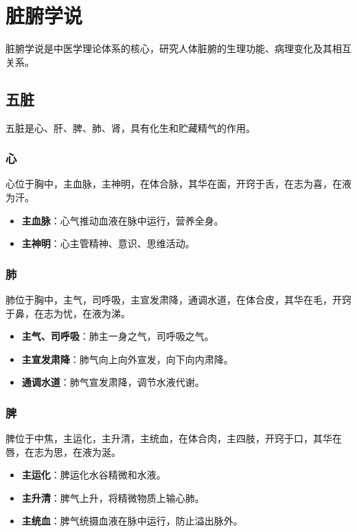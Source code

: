 \documentclass[12pt,UTF8]{ctexbook}
\begin{document}
\section{脏腑学说}

脏腑学说是中医学理论体系的核心，研究人体脏腑的生理功能、病理变化及其相互关系。

\subsection{五脏}

五脏是心、肝、脾、肺、肾，具有化生和贮藏精气的作用。

\subsubsection{心}

心位于胸中，主血脉，主神明，在体合脉，其华在面，开窍于舌，在志为喜，在液为汗。

\begin{itemize}
\item \textbf{主血脉}：心气推动血液在脉中运行，营养全身。
\item \textbf{主神明}：心主管精神、意识、思维活动。
\end{itemize}

\subsubsection{肺}

肺位于胸中，主气，司呼吸，主宣发肃降，通调水道，在体合皮，其华在毛，开窍于鼻，在志为忧，在液为涕。

\begin{itemize}
\item \textbf{主气、司呼吸}：肺主一身之气，司呼吸之气。
\item \textbf{主宣发肃降}：肺气向上向外宣发，向下向内肃降。
\item \textbf{通调水道}：肺气宣发肃降，调节水液代谢。
\end{itemize}

\subsubsection{脾}

脾位于中焦，主运化，主升清，主统血，在体合肉，主四肢，开窍于口，其华在唇，在志为思，在液为涎。

\begin{itemize}
\item \textbf{主运化}：脾运化水谷精微和水液。
\item \textbf{主升清}：脾气上升，将精微物质上输心肺。
\item \textbf{主统血}：脾气统摄血液在脉中运行，防止溢出脉外。
\end{itemize}
\end{document}
